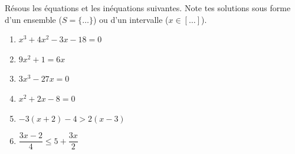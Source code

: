 %
%
    Résous les équations et les inéquations suivantes. Note tes solutions sous forme d'un ensemble (\(S = \{\dots\}\)) ou d'un intervalle (\(x \in [\dots]\)).
    \begin{enumerate}[cols=2]
        \item %
              $x^{3}+4x^{2}-3x -18=0$
        \item %
              $9x^{2}+1=6x$
        \item %
              $3x^{3}-27x=0$
        \item %
              $x^{2}+2x-8 =0$
        \item \(-3(x + 2)-4 > 2(x-3)\)
        \item \(\dfrac{3x-2}{4} \le 5 + \dfrac{3x}{2}\)
    \end{enumerate}
